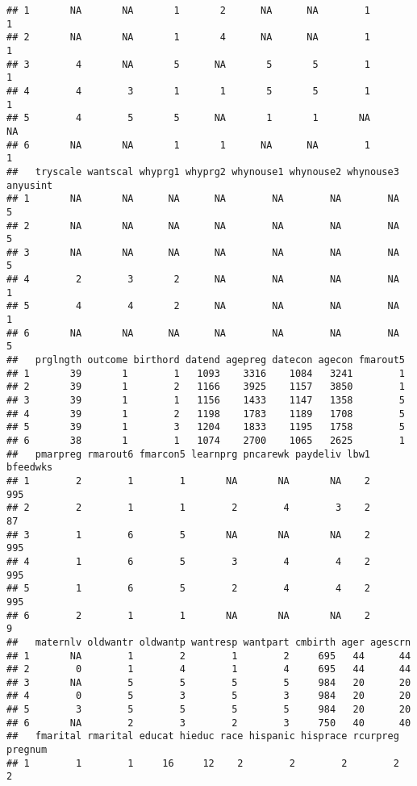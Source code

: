\documentclass[]{article}
\begin{document}
\begin{verbatim}
## 1       NA       NA       1       2      NA      NA        1        1
## 2       NA       NA       1       4      NA      NA        1        1
## 3        4       NA       5      NA       5       5        1        1
## 4        4        3       1       1       5       5        1        1
## 5        4        5       5      NA       1       1       NA       NA
## 6       NA       NA       1       1      NA      NA        1        1
##   tryscale wantscal whyprg1 whyprg2 whynouse1 whynouse2 whynouse3 anyusint
## 1       NA       NA      NA      NA        NA        NA        NA        5
## 2       NA       NA      NA      NA        NA        NA        NA        5
## 3       NA       NA      NA      NA        NA        NA        NA        5
## 4        2        3       2      NA        NA        NA        NA        1
## 5        4        4       2      NA        NA        NA        NA        1
## 6       NA       NA      NA      NA        NA        NA        NA        5
##   prglngth outcome birthord datend agepreg datecon agecon fmarout5
## 1       39       1        1   1093    3316    1084   3241        1
## 2       39       1        2   1166    3925    1157   3850        1
## 3       39       1        1   1156    1433    1147   1358        5
## 4       39       1        2   1198    1783    1189   1708        5
## 5       39       1        3   1204    1833    1195   1758        5
## 6       38       1        1   1074    2700    1065   2625        1
##   pmarpreg rmarout6 fmarcon5 learnprg pncarewk paydeliv lbw1 bfeedwks
## 1        2        1        1       NA       NA       NA    2      995
## 2        2        1        1        2        4        3    2       87
## 3        1        6        5       NA       NA       NA    2      995
## 4        1        6        5        3        4        4    2      995
## 5        1        6        5        2        4        4    2      995
## 6        2        1        1       NA       NA       NA    2        9
##   maternlv oldwantr oldwantp wantresp wantpart cmbirth ager agescrn
## 1       NA        1        2        1        2     695   44      44
## 2        0        1        4        1        4     695   44      44
## 3       NA        5        5        5        5     984   20      20
## 4        0        5        3        5        3     984   20      20
## 5        3        5        5        5        5     984   20      20
## 6       NA        2        3        2        3     750   40      40
##   fmarital rmarital educat hieduc race hispanic hisprace rcurpreg pregnum
## 1        1        1     16     12    2        2        2        2       2

\end{verbatim}
\end{document}
